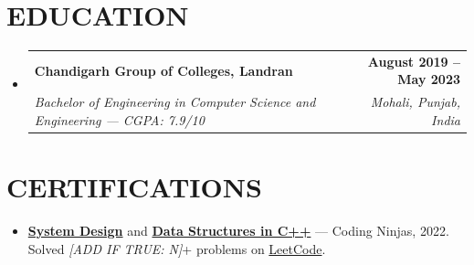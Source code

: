 \documentclass[letterpaper,11pt]{article}
\makeatletter
\newcommand{\resumeItem}[1]{\item\small{{#1 \vspace{-2pt}}}}
\newcommand{\resumeSubheading}[4]{
  \vspace{-2pt}\item
    \begin{tabular*}{1.0\textwidth}[t]{l@{\extracolsep{\fill}}r}
      \textbf{\large#1} & \textbf{\small #2} \\
      \textit{\small#3} & \textit{\small #4} \\
    \end{tabular*}\vspace{-7pt}
}
\newcommand{\resumeSubHeadingListStart}{\begin{itemize}[leftmargin=0.0in, label={}]}
\newcommand{\resumeSubHeadingListEnd}{\end{itemize}}
\newcommand{\resumeItemListStart}{\begin{itemize}}
\newcommand{\resumeItemListEnd}{\end{itemize}\vspace{-5pt}}
\makeatother
\begin{document}
\vspace{-10pt}

\section{EDUCATION}
  \resumeSubHeadingListStart
    \resumeSubheading
      {Chandigarh Group of Colleges, Landran}{August 2019 -- May 2023}
      {Bachelor of Engineering in Computer Science and Engineering — CGPA: 7.9/10}{Mohali, Punjab, India}
  \resumeSubHeadingListEnd

\vspace{-6pt}

\section{CERTIFICATIONS}
    \vspace{2pt}
    \resumeItemListStart
        \resumeItem{\textbf{\href{http://ninjasfiles.s3.amazonaws.com/certificate18894980e4209379ac28665887f78da42bac5c2.pdf}{System Design}} and \textbf{\href{https://ninjasfiles.s3.amazonaws.com/certificate19853580c201378561a01f48ae87f59e9220db2.pdf}{Data Structures in C++}} — Coding Ninjas, 2022. Solved \textit{[ADD IF TRUE: N]}+ problems on \href{https://leetcode.com/u/sachinkumar6174/}{LeetCode}.}
    \resumeItemListEnd
\end{document}
